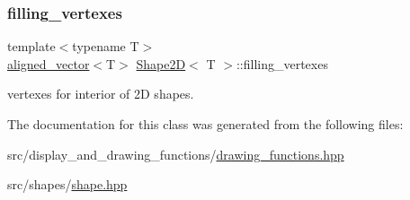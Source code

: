 \subsubsection{\texorpdfstring{filling\+\_\+vertexes}{filling\_vertexes}}
{\footnotesize\ttfamily template$<$typename T$>$ \\
\mbox{\hyperlink{type__definitions_8hpp_a087efd587d66b881646ef378f1919c90}{aligned\+\_\+vector}}$<$T$>$ \mbox{\hyperlink{classShape2D}{Shape2D}}$<$ T $>$\+::filling\+\_\+vertexes\hspace{0.3cm}{\ttfamily [protected]}}

vertexes for interior of 2D shapes. 

The documentation for this class was generated from the following files\+:\begin{DoxyCompactItemize}
\item 
src/display\+\_\+and\+\_\+drawing\+\_\+functions/\mbox{\hyperlink{drawing__functions_8hpp}{drawing\+\_\+functions.\+hpp}}\item 
src/shapes/\mbox{\hyperlink{shape_8hpp}{shape.\+hpp}}\end{DoxyCompactItemize}
